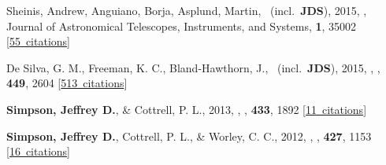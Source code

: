 \item[{\color{numcolor}\scriptsize4}] Sheinis, Andrew, Anguiano, Borja, Asplund, Martin, \etal\ (incl.\ \textbf{JDS}), 2015, , Journal of Astronomical Telescopes, Instruments, and Systems, \textbf{1}, 35002 [\href{https://ui.adsabs.harvard.edu/#abs/2015JATIS...1c5002S}{55~citations}]

\item[{\color{numcolor}\scriptsize3}] De Silva, G. M., Freeman, K. C., Bland-Hawthorn, J., \etal\ (incl.\ \textbf{JDS}), 2015, , \mnras, \textbf{449}, 2604 [\href{https://ui.adsabs.harvard.edu/#abs/2015MNRAS.449.2604D}{513~citations}]

\item[{\color{numcolor}\scriptsize2}] \textbf{Simpson, Jeffrey D.}, \& Cottrell, P. L., 2013, , \mnras, \textbf{433}, 1892 [\href{https://ui.adsabs.harvard.edu/#abs/2013MNRAS.433.1892S}{11~citations}]

\item[{\color{numcolor}\scriptsize1}] \textbf{Simpson, Jeffrey D.}, Cottrell, P. L., \& Worley, C. C., 2012, , \mnras, \textbf{427}, 1153 [\href{https://ui.adsabs.harvard.edu/#abs/2012MNRAS.427.1153S}{16~citations}]